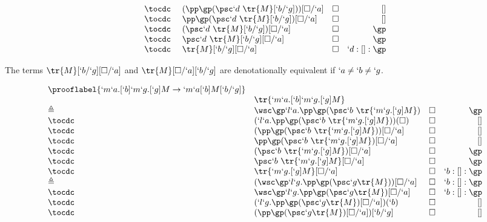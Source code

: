 \begin{Proof}
\[\begin{array}{llrr}
  \tocdc\     & (\pp \gp (\psc `d\ \tr{M}[`b/`g]))[\square/`a]   & \square & []        \\
  \tocdc\     & \pp \gp (\psc `d\ \tr{M}[`b/`g])[\square/`a]     & \square & []        \\
  \tocdc\     & (\psc `d\ \tr{M}[`b/`g])[\square/`a]             & \square & \gp       \\
  \tocdc\     & \psc `d\ \tr{M}[`b/`g][\square/`a]               & \square & \gp       \\
  \tocdc\     & \tr{M}[`b/`g][\square/`a]                        & \square & `d:[]:\gp \\
\end{array}
\]
\begin{remark}
  The terms $\tr{M}[`b/`g][\square/`a]$ and $\tr{M}[\square/`a][`b/`g]$ are denotationally equivalent if $`a \not= `b \not= `g$.
\end{remark}
\[
\begin{array}{llrr}
  \prooflabel{`m`a.[`b]`m`g.[`g]M \to `m`a[`b]M[`b/`g]} \\
             & \tr{`m`a.[`b]`m`g.[`g]M} \\
  \triangleq & \wsc \gp `l`a.\pp \gp (\psc `b\ \tr{`m`g.[`g]M})     & \square & \gp        \\
  \tocdc\    & (`l`a.\pp \gp (\psc `b\ \tr{`m`g.[`g]M}))(\square)   & \square & []         \\
  \tocdc\    & (\pp \gp (\psc `b\ \tr{`m`g.[`g]M}))[\square/`a]     & \square & []         \\
  \tocdc\    & \pp \gp (\psc `b\ \tr{`m`g.[`g]M})[\square/`a]       & \square & []         \\
  \tocdc\    & (\psc `b\ \tr{`m`g.[`g]M})[\square/`a]               & \square & \gp        \\
  \tocdc\    & \psc `b\ \tr{`m`g.[`g]M}[\square/`a]                 & \square & \gp        \\
  \tocdc\    & \tr{`m`g.[`g]M}[\square/`a]                          & \square & `b:[]:\gp  \\
  \triangleq & (\wsc \gp `l`g.\pp \gp (\psc `g \tr{M}))[\square/`a] & \square & `b:[]:\gp  \\
  \tocdc\    & \wsc \gp `l`g.\pp \gp (\psc `g \tr{M})[\square/`a]   & \square & `b:[]:\gp  \\
  \tocdc\    & (`l`g.\pp \gp (\psc `g \tr{M})[\square/`a])(`b)      & \square & []  \\
  \tocdc\    & (\pp \gp (\psc `g \tr{M})[\square/`a])[`b/`g]        & \square & []  \\

\end{array}\]
\end{Proof}
